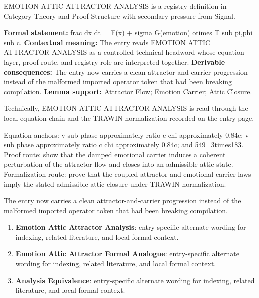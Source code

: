 
\begingroup\small
{}
EMOTION ATTIC ATTRACTOR ANALYSIS is a registry definition in Category Theory and Proof Structure with secondary pressure from Signal.

\begingroup\footnotesize\setlength{\emergencystretch}{3em}\sloppy
\textbf{Formal statement:} frac dx dt = F(x) + sigma G(emotion) otimes T sub pi,phi sub c. \textbf{Contextual meaning:} The entry reads EMOTION ATTIC ATTRACTOR ANALYSIS as a controlled technical headword whose equation layer, proof route, and registry role are interpreted together. \textbf{Derivable consequences:} The entry now carries a clean attractor-and-carrier progression instead of the malformed imported operator token that had been breaking compilation. \textbf{Lemma support:} Attractor Flow; Emotion Carrier; Attic Closure.\par
\endgroup

Technically, EMOTION ATTIC ATTRACTOR ANALYSIS is read through the local equation chain and the TRAWIN normalization recorded on the entry page.

Equation anchors: v sub phase approximately ratio c chi approximately 0.84c; v sub phase approximately ratio c chi approximately 0.84c; and 549=3times183. Proof route: show that the damped emotional carrier induces a coherent perturbation of the attractor flow and closes into an admissible attic state. Formalization route: prove that the coupled attractor and emotional carrier laws imply the stated admissible attic closure under TRAWIN normalization.

The entry now carries a clean attractor-and-carrier progression instead of the malformed imported operator token that had been breaking compilation.
\endgroup

\begin{enumerate}[leftmargin=1.6em,itemsep=6pt,topsep=4pt]
\item \textbf{Emotion Attic Attractor Analysis}: entry-specific alternate wording for indexing, related literature, and local formal context.
\item \textbf{Emotion Attic Attractor Formal Analogue}: entry-specific alternate wording for indexing, related literature, and local formal context.
\item \textbf{Analysis Equivalence}: entry-specific alternate wording for indexing, related literature, and local formal context.
\end{enumerate}

